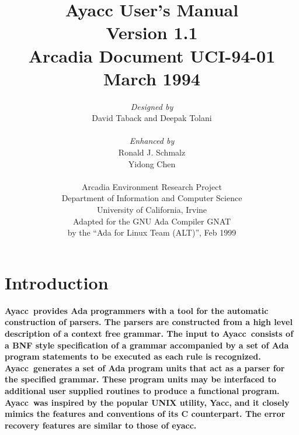 \title{{\bf Ayacc User's Manual}\\
\medskip
Version 1.1\\
Arcadia Document UCI-94-01\\
March 1994}
\author{
{\it Designed by}\\
David Taback and Deepak Tolani\\
\medskip\\
{\it Enhanced by}\\
Ronald J. Schmalz\\
Yidong Chen\\
\medskip\\
Arcadia Environment Research Project\\
Department of Information and Computer Science\\
University of California, Irvine
\medskip\\
Adapted for the GNU Ada Compiler GNAT\\
by the ``Ada for Linux Team (ALT)'', Feb 1999}
\date{}
\newcommand{\ayacc}{\bf Ayacc\rm\  }

   \addtolength{\oddsidemargin}{-0.5in} %
   \addtolength{\textwidth}{1.0in}
   \addtolength{\topmargin}{-0.5in}   
   \addtolength{\textheight}{1.25in}
   \renewcommand{\baselinestretch}{1.0} %
   \renewcommand{\topfraction}{0.95}
   \renewcommand{\textfraction}{0.05}  %


\begin{titlepage}
\maketitle
\end{titlepage}
\tableofcontents
\newpage
\listoffigures
\newpage
\section{Introduction}
\ayacc provides Ada programmers with a tool for the
automatic construction of parsers.  The parsers are constructed
from a high level description
of a context free grammar.  The input to \ayacc consists of a
BNF style specification of a grammar accompanied by a set of
Ada program statements to be executed as each rule is
recognized.  \ayacc generates a set of Ada program units that act as
a parser for the specified grammar.  These program units
may be interfaced to additional user supplied routines to produce a
functional program.  \ayacc was inspired by the popular UNIX
utility, {\bf Yacc}, and it closely mimics the features and conventions
of its C counterpart.  The error recovery features are similar to
those of eyacc.
